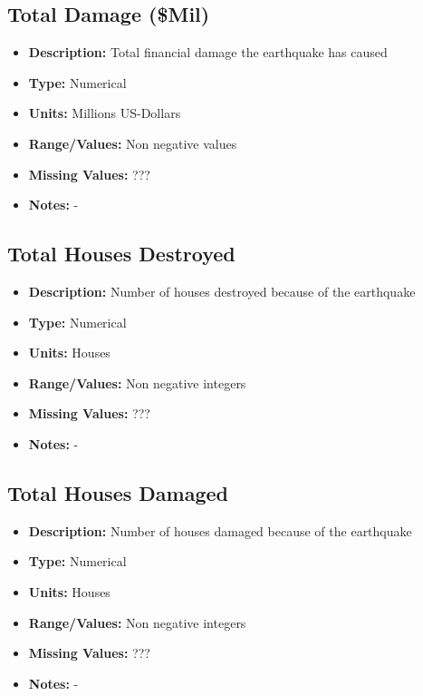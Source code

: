 \documentclass{article}
\begin{document}
\subsection{Total Damage (\$Mil)}
\begin{itemize}
    \item \textbf{Description:} Total financial damage the earthquake has caused
    \item \textbf{Type:} Numerical
    \item \textbf{Units:} Millions US-Dollars
    \item \textbf{Range/Values:} Non negative values 
    \item \textbf{Missing Values:} ???
    \item \textbf{Notes:} -
\end{itemize}


\subsection{Total Houses Destroyed}
\begin{itemize}
    \item \textbf{Description:} Number of houses destroyed because of the earthquake
    \item \textbf{Type:} Numerical
    \item \textbf{Units:} Houses
    \item \textbf{Range/Values:} Non negative integers
    \item \textbf{Missing Values:} ???
    \item \textbf{Notes:} -
\end{itemize}

\subsection{Total Houses Damaged}
\begin{itemize}
    \item \textbf{Description:} Number of houses damaged because of the earthquake
    \item \textbf{Type:} Numerical
    \item \textbf{Units:} Houses
    \item \textbf{Range/Values:} Non negative integers
    \item \textbf{Missing Values:} ???
    \item \textbf{Notes:} -
\end{itemize}
\end{document}
